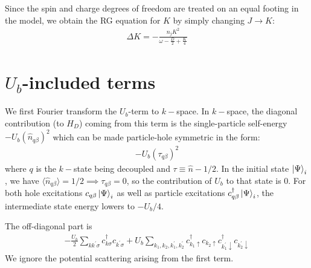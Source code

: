 \documentclass[10pt]{report}
\numberwithin{equation}{section}
\begin{document}
\begin{appendices}
Since the spin and charge degrees of freedom are treated on an equal footing in the model, we obtain the RG equation for \(K\) by simply changing \(J \to K\):
\begin{equation}\begin{aligned}
	\Delta K = -\frac{n_j K^2}{\omega - \frac{D}{2} + \frac{K}{4}}
\end{aligned}\end{equation}

\section{\(U_b\)-included terms}

We first Fourier transform the \(U_b\)-term to \(k-\)space. In \(k-\)space, the diagonal contribution (to \(H_D\)) coming from this term is the single-particle self-energy \(-U_b\left(\hat n_{q \beta}\right)^2\) which can be made particle-hole symmetric in the form:
\begin{equation}\begin{aligned}
	-U_b\left(\tau_{q \beta}\right)^2
\end{aligned}\end{equation}
where \(q\) is the \(k-\)state being decoupled and \(\tau \equiv \hat n - 1/2\). In the initial state \(\ket{\Psi}_i\), we have \(\langle \hat n_{q\beta} \rangle = 1/2 \implies \tau_{q\beta} = 0\), so the contribution of \(U_b\) to that state is 0. For both hole excitations \(c_{q\beta}\ket{\Psi}_i\) as well as particle excitations \(c^\dagger_{q\beta}\ket{\Psi}_i\), the intermediate state energy lowers to \(-U_b/4\).

The off-diagonal part is
\begin{equation}\begin{aligned}
	-\frac{U_b}{2}\sum_{kk^\prime\sigma}c^\dagger_{k\sigma}c_{k^\prime\sigma} + U_b \sum_{k_1,k_2,k_1^\prime,k_2^\prime} c^\dagger_{k_1 \uparrow}c_{k_2 \uparrow} c^\dagger_{k^\prime_1 \downarrow}c_{k^\prime_2 \downarrow} 
\end{aligned}\end{equation}
We ignore the potential scattering arising from the first term.


\end{appendices}
\end{document}
